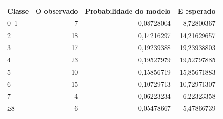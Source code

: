 \begin{tabular}{lrrr}
\toprule
Classe & O observado & Probabilidade do modelo & E esperado \\
\midrule
0–1 & 7 & 0,08728004 & 8,72800367 \\
2 & 18 & 0,14216297 & 14,21629657 \\
3 & 17 & 0,19239388 & 19,23938803 \\
4 & 23 & 0,19527979 & 19,52797885 \\
5 & 10 & 0,15856719 & 15,85671883 \\
6 & 15 & 0,10729713 & 10,72971307 \\
7 & 4 & 0,06223234 & 6,22323358 \\
≥8 & 6 & 0,05478667 & 5,47866739 \\
\bottomrule
\end{tabular}
